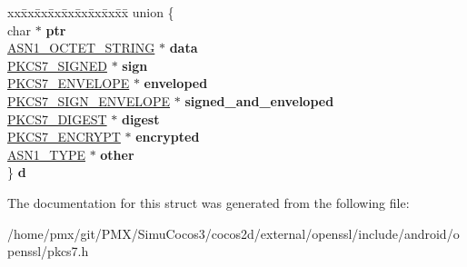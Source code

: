 \begin{DoxyCompactItemize}
\begin{tabbing}
\end{tabbing}\item 
\mbox{\label{structpkcs7__st_aed75fd2cef91398eec7a184ac7f444f9}} 
\begin{tabbing}
xx\=xx\=xx\=xx\=xx\=xx\=xx\=xx\=xx\=\kill
union \{\\
\>char $\ast$ {\bfseries ptr}\\
\>\hyperlink{structasn1__string__st}{ASN1\_OCTET\_STRING} $\ast$ {\bfseries data}\\
\>\hyperlink{structpkcs7__signed__st}{PKCS7\_SIGNED} $\ast$ {\bfseries sign}\\
\>\hyperlink{structpkcs7__enveloped__st}{PKCS7\_ENVELOPE} $\ast$ {\bfseries enveloped}\\
\>\hyperlink{structpkcs7__signedandenveloped__st}{PKCS7\_SIGN\_ENVELOPE} $\ast$ {\bfseries signed\_and\_enveloped}\\
\>\hyperlink{structpkcs7__digest__st}{PKCS7\_DIGEST} $\ast$ {\bfseries digest}\\
\>\hyperlink{structpkcs7__encrypted__st}{PKCS7\_ENCRYPT} $\ast$ {\bfseries encrypted}\\
\>\hyperlink{structasn1__type__st}{ASN1\_TYPE} $\ast$ {\bfseries other}\\
\} {\bfseries d}\\

\end{tabbing}\end{DoxyCompactItemize}


The documentation for this struct was generated from the following file\+:\begin{DoxyCompactItemize}
\item 
/home/pmx/git/\+P\+M\+X/\+Simu\+Cocos3/cocos2d/external/openssl/include/android/openssl/pkcs7.\+h\end{DoxyCompactItemize}
